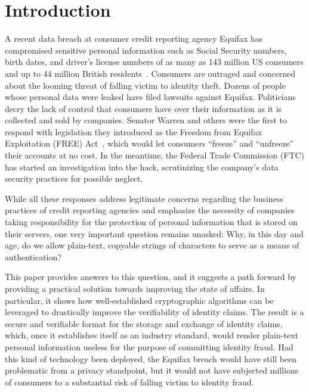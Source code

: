 \documentclass[conference]{IEEEtran}
\begin{document}
\section{Introduction}
A recent data breach at consumer credit reporting agency Equifax has compromised 
sensitive personal information such as Social Security numbers, birth dates, 
and driver's license numbers of as many as 143 million US consumers and up to 44 
million British residents~\cite{guardian09}. Consumers are outraged and concerned 
about the looming threat of falling victim to identity theft. Dozens of people 
whose personal
data were leaked have filed lawsuits against Equifax. Politicians decry the 
lack of control that consumers have over their information as it is collected
and sold by companies. Senator Warren and others were the first to respond
with legislation they introduced as the Freedom from Equifax Exploitation (FREE) Act~\cite{warren}, which would let 
consumers ``freeze'' and ``unfreeze'' their accounts at no cost. In the meantime, 
the Federal Trade Commission (FTC) has started an investigation into the hack, 
scrutinizing the company's data security practices for possible neglect.

While all these responses address legitimate concerns regarding the business 
practices of credit reporting agencies and emphasize the necessity 
of companies taking responsibility for the protection of personal 
information that is stored on their servers, one very important question
remains unasked: Why, in this day and age, do we allow plain-text, copyable
strings of characters to serve as a means of authentication?

This paper provides answers to this question, and it suggests a path forward 
by providing a practical solution towards improving the state of affairs. In particular, 
it shows how well-established cryptographic algorithms can be leveraged to 
drastically improve the verifiability of identity claims. The result is a 
secure and verifiable format for the storage and exchange of identity claims,
which, once it establishes itself as an industry standard, would render
plain-text personal information useless for the purpose of committing identity 
fraud. Had this kind of technology been deployed, the Equifax breach would 
have still been problematic from a privacy standpoint, but it would not have 
subjected millions of consumers to a substantial risk of falling victim to 
identity fraud. 
\end{document}
